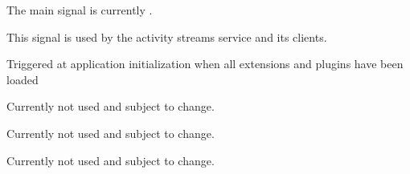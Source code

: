 \documentclass[a4paper,12pt,english]{sphinxmanual}
\begin{document}
The main signal is currently {\hyperref[api:abilian.core.signals.activity]{\emph{}}}.

\begin{fulllineitems}
\label{api:abilian.core.signals.activity}
This signal is used by the activity streams service and its clients.

\end{fulllineitems}


\begin{fulllineitems}
\label{api:abilian.core.signals.components_registered}
Triggered at application initialization when all extensions and plugins have
been loaded

\end{fulllineitems}


\begin{fulllineitems}
\label{api:abilian.core.signals.entity_created}
Currently not used and subject to change.

\end{fulllineitems}


\begin{fulllineitems}
\label{api:abilian.core.signals.entity_deleted}
Currently not used and subject to change.

\end{fulllineitems}


\begin{fulllineitems}
\label{api:abilian.core.signals.entity_updated}
Currently not used and subject to change.

\end{fulllineitems}
\end{document}

